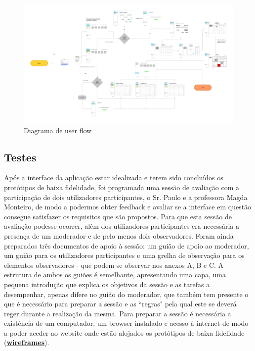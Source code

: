 \documentclass[11pt, twoside]{report}
\begin{document}
	\begin{landscape}
		\pagestyle{empty}
		\begin{figure}[H] 
			\centering 							\includegraphics[width=1.5\textwidth,height=1.5\textheight,keepaspectratio]{image/diagramauserflow}
			\caption{Diagrama de user flow}
		\end{figure}
	\end{landscape}

	\subsection{Testes}
	\label{primeiroTeste}
		Após a interface da aplicação estar idealizada e terem sido concluídos os protótipos de baixa fidelidade, foi programada uma sessão de avaliação com a participação de dois utilizadores participantes, o Sr. Paulo e a professora Magda Monteiro, de modo a podermos obter feedback e avaliar se a interface em questão consegue satisfazer os requisitos que são propostos. Para que esta sessão de avaliação podesse ocorrer, além dos utilizadores participantes era necessária a presença de um moderador e de pelo menos dois observadores. Foram ainda preparados três documentos de apoio à sessão: um guião de apoio ao moderador, um guião para os utilizadores participantes e uma grelha de observação para os elementos observadores - que podem se observar nos anexos A, B e C. A estrutura de ambos os guiões é semelhante, apresentando uma capa, uma pequena introdução que explica os objetivos da sessão e as tarefas a desempenhar, apenas difere no guião do moderador, que também tem presente o que é necessário para preparar a sessão e as ``regras" pela qual este se deverá reger durante a realização da mesma. Para preparar a sessão é necessária a existência de um computador, um browser instalado e acesso à internet de modo a poder aceder ao website onde estão alojados os protótipos de baixa fidelidade (\href{https://www.figma.com/file/nhb5nnIrt3fdDoQhYpsN80/Calendario?node-id=9\%3A154}{\textbf{wireframes}}).
\end{document}
